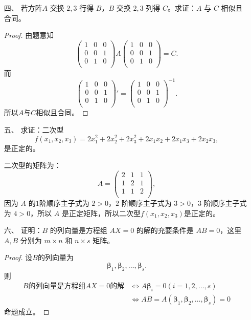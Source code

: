 \begin{enumerate}[1~]
\item[四、]
若方阵$ A$ 交换 $2, 3$ 行得 $B$，$B$ 交换 $2, 3$ 列得 $C$。求证：$A$ 与 $C$ 相似且合同。
\begin{proof}
由题意知\[
\left( \begin{matrix}
	1&		0&		0\\
	0&		0&		1\\
	0&		1&		0\\
\end{matrix} \right) A\left( \begin{matrix}
	1&		0&		0\\
	0&		0&		1\\
	0&		1&		0\\
\end{matrix} \right) =C.
\]
而\[
\left( \begin{matrix}
	1&		0&		0\\
	0&		0&		1\\
	0&		1&		0\\
\end{matrix} \right)'=\left( \begin{matrix}
	1&		0&		0\\
	0&		0&		1\\
	0&		1&		0\\
\end{matrix} \right) ^{-1}.
\]
所以$A$与$C$相似且合同。
\end{proof}

\item[五、] 
求证：二次型\[
f(x_1, x_2, x_3) = 2x^2_1 + 2x^2_2 + 2x^2_3 + 2x_1x_2 + 2x_1x_3 + 2x_2x_3,
\]
是正定的。
\begin{solution}
二次型的矩阵为：\[
A=\left( \begin{matrix}
	2&		1&		1\\
	1&		2&		1\\
	1&		1&		2\\
\end{matrix} \right) ,
\]
因为 $A$ 的$1$阶顺序主子式为 $2>0$，$2$ 阶顺序主子式为 $3>0$，$3$ 阶顺序主子式为 $4>0$，所以 $A$ 是正定矩阵，所以二次型$f(x_1, x_2, x_3)$是正定的。
\end{solution}

\item[六、]
证明：$B$ 的列向量是方程组 $AX = 0$ 的解的充要条件是 $AB = 0$，这里 $A, B$ 分别为 $m \times n$ 和 $n \times s$ 矩阵。
\begin{proof}
设$B$的列向量为\[
\boldsymbol{\beta}_1, \boldsymbol{\beta}_2, \dots , \boldsymbol{\beta}_s.
\]
则\begin{align*}
B\text{的列向量是方程组}AX=0\text{的解}
&\Leftrightarrow A\boldsymbol{\beta}_i=0\left(i=1,2,\dots , s \right) \\
&\Leftrightarrow AB=A\left( \boldsymbol{\beta }_1,\boldsymbol{\beta }_2,\dots ,\boldsymbol{\beta}_s \right) =0
\end{align*}
命题成立。
\end{proof}


\end{enumerate}
